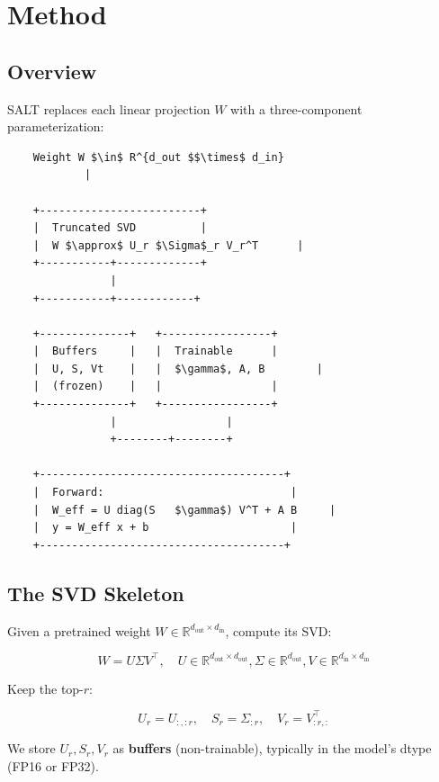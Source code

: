 
\section{Method}

\subsection{Overview}

SALT replaces each linear projection $W$ with a three-component parameterization:

\begin{lstlisting}
    Weight W $\in$ R^{d_out $$\times$ d_in}
            |
             
    +-------------------------+
    |  Truncated SVD          |
    |  W $\approx$ U_r $\Sigma$_r V_r^T      |
    +-----------+-------------+
                |
    +-----------+------------+
                              
    +--------------+   +-----------------+
    |  Buffers     |   |  Trainable      |
    |  U, S, Vt    |   |  $\gamma$, A, B        |
    |  (frozen)    |   |                 |
    +--------------+   +-----------------+
                |                 |
                +--------+--------+
                          
    +--------------------------------------+
    |  Forward:                             |
    |  W_eff = U diag(S   $\gamma$) V^T + A B     |
    |  y = W_eff x + b                      |
    +--------------------------------------+
\end{lstlisting}

\subsection{The SVD Skeleton}

Given a pretrained weight $W \in \mathbb{R}^{d_\text{out} \times d_\text{in}}$, 
compute its SVD:

\[
W = U \Sigma V^\top, \quad U \in \mathbb{R}^{d_\text{out} \times d_\text{out}}, 
\Sigma \in \mathbb{R}^{d_\text{out}}, V \in \mathbb{R}^{d_\text{in} \times d_\text{in}}
\tag{4.1}
\]

Keep the top-$r$:

\[
U_r = U_{:, :r}, \quad S_r = \Sigma_{:r}, \quad V_r = V_{:r, :}^\top
\tag{4.2}
\]

We store $U_r, S_r, V_r$ as \textbf{buffers} (non-trainable), typically in the 
model's dtype (FP16 or FP32).


